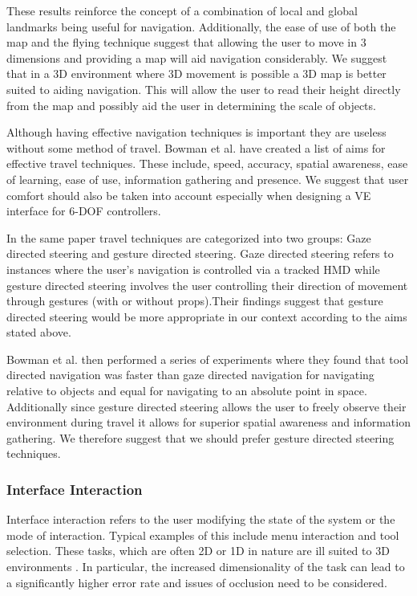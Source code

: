 \documentclass{sig-alternate-05-2015}
\begin{document}
These results reinforce the concept of a combination of local and global landmarks being useful for navigation\cite{Darken1993}. Additionally, the ease of use of both the map and the flying technique suggest that allowing the user to move in 3 dimensions and providing a map will aid navigation considerably. We suggest that in a 3D environment where 3D movement is possible a 3D map is better suited to aiding navigation. This will allow the user to read their height directly from the map and possibly aid the user in determining the scale of objects.

Although having effective navigation techniques is important they are useless without some method of travel. Bowman et al. have created a list of aims for effective travel techniques.\cite{Bowman1997} These include, speed, accuracy, spatial awareness, ease of learning, ease of use, information gathering and presence. We suggest that user comfort should also be taken into account especially when designing a VE interface for 6-DOF controllers.

In the same paper travel techniques are categorized into two groups: Gaze directed steering and gesture directed steering\cite{Bowman1997}. Gaze directed steering refers to instances where the user's navigation is controlled via a tracked HMD while gesture directed  steering involves the user controlling their direction of movement through gestures (with or without props).Their findings suggest that gesture directed steering would be more appropriate in our context according to the aims stated above.

Bowman et al. then performed a series of experiments where they found that tool directed navigation was faster than gaze directed navigation for navigating relative to objects and equal for navigating to an absolute point in space. Additionally since gesture directed steering allows the user to freely observe their environment during travel it allows for superior spatial awareness and information gathering. We therefore suggest that we should prefer gesture directed steering techniques.

\subsubsection{Interface Interaction}
Interface interaction refers to the user modifying the state of the system or the mode of interaction\cite{Bowman2001}. Typical examples of this include menu interaction and tool selection. These tasks, which are often 2D or 1D in nature are ill suited to 3D environments \cite{Bowman2001, Hand1997}. In particular, the increased dimensionality of the task can lead to a significantly higher error rate and issues of occlusion need to be considered\cite{Hand1997}.
\end{document}
